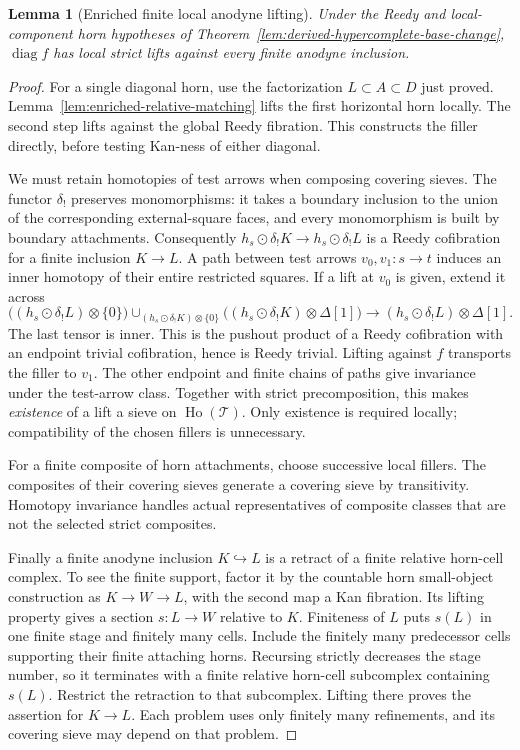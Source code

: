 \documentclass[10pt,a4paper]{amsart}
\newcommand{\CT}{\mathcal T}
\theoremstyle{plain}
\newtheorem{lem}[thm]{Lemma}
\theoremstyle{definition}
\theoremstyle{remark}
\begin{document}
\begin{lem}[Enriched finite local anodyne lifting]
Under the Reedy and local-component horn hypotheses of
Theorem~\ref{lem:derived-hypercomplete-base-change},
$\operatorname{diag}f$ has local strict lifts against
every finite anodyne inclusion.
\label{lem:enriched-diagonal-local-lifting}
\end{lem}

\begin{proof}
For a single diagonal horn, use the factorization
$L\subset A\subset D$ just proved.
Lemma~\ref{lem:enriched-relative-matching} lifts the
first horizontal horn locally. The second step lifts
against the global Reedy fibration. This constructs
the filler directly, before testing Kan-ness of
either diagonal.

We must retain homotopies of test arrows when composing
covering sieves. The functor $\delta_!$ preserves
monomorphisms: it takes a boundary inclusion to the
union of the corresponding external-square faces, and
every monomorphism is built by boundary attachments.
Consequently $h_s\odot\delta_!K\to h_s\odot\delta_!L$
is a Reedy cofibration for a finite inclusion $K\to L$.
A path between test arrows $v_0,v_1:s\to t$ induces
an inner homotopy of their entire restricted squares.
If a lift at $v_0$ is given, extend it across
\[
 \bigl((h_s\odot\delta_!L)\otimes\{0\}\bigr)
 \mathop{\cup}_{(h_s\odot\delta_!K)\otimes\{0\}}
 \bigl((h_s\odot\delta_!K)\otimes\Delta[1]\bigr)
 \longrightarrow (h_s\odot\delta_!L)\otimes\Delta[1].
\]
The last tensor is inner. This is the pushout product
of a Reedy cofibration with an endpoint trivial
cofibration, hence is Reedy trivial. Lifting against
$f$ transports the filler to $v_1$. The other endpoint
and finite chains of paths give invariance under the
test-arrow class. Together with strict precomposition,
this makes \emph{existence} of a lift a sieve on
$\operatorname{Ho}(\CT)$. Only existence is required
locally; compatibility of the chosen fillers is
unnecessary.

For a finite composite of horn attachments, choose
successive local fillers. The composites of their
covering sieves generate a covering sieve by transitivity.
Homotopy invariance handles actual representatives of
composite classes that are not the selected strict
composites.

Finally a finite anodyne inclusion $K\hookrightarrow L$
is a retract of a finite relative horn-cell complex.
To see the finite support, factor it by the countable
horn small-object construction as
$K\to W\to L$, with the second map a Kan fibration.
Its lifting property gives a section $s:L\to W$
relative to $K$. Finiteness of $L$ puts $s(L)$ in
one finite stage and finitely many cells. Include the
finitely many predecessor cells supporting their finite
attaching horns. Recursing strictly decreases the
stage number, so it terminates with a finite relative
horn-cell subcomplex containing $s(L)$. Restrict the
retraction to that subcomplex. Lifting there proves
the assertion for $K\to L$.
Each problem uses only finitely many refinements,
and its covering sieve may depend on that problem.
\end{proof}
\end{document}
